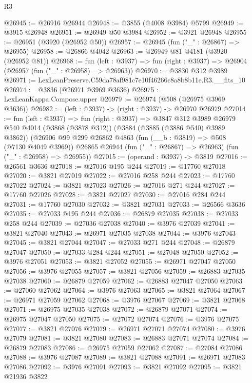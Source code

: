 \begin{lexlean}{R3}
\begin{coremodule}
@26945 := @26916 @26944
@26948 := @3855 (@4008 @3984) @5799
@26949 := @3915 @26948
@26951 := @26949 @50 @3984
@26952 := @3921 @26948
@26955 := @26951 (@3920 (@26952 @50))
@26957 := @26945 (fun ("_" : @26867) => @26955)
@26958 := @26866 @4042
@26963 := @26949 @81 @4181 (@3920 (@26952 @81))
@26968 := fun (left : @3937) =>
  fun (right : @3937) => @26904 (@26957 (fun ("_" : @26958) => @26963))
@26970 := @3830 @312 @3989
@26971 := LexLeanPreserve.C59da78af981c7e10f46266c8a8b8b11e.R3.__fits_10
@26974 := @3836 (@26971 @3969 @3636)
@26975 := LexLeanKappa.Compose.upper
@26979 := @26974 (@508 (@26975 @3969 @3636))
@26982 := (left : @3937) -> (right : @3937) -> @26970 @26979
@27014 := fun (left : @3937) =>
  fun (right : @3937) =>
  @3847
    @312
    @3989
    @26979
    @540
    @4014
    (@3868 (@3878 @312))
    (@3884 (@3885 (@3886 @540) @3989 @3862))
    (@26906
      @99
      @299
      @26862
      @4863
      (fun (__b : @3819) => @508 (@7130 @4049 @3969))
      @26865
      @26944
      (fun ("_" : @26867) => @26963)
      (fun ("_" : @26958) => @26955))
@27015 := (operand : @3937) -> @3819
@27016 := @26561 @3636
@27018 := @27016 @195 @244
@27019 := @17760 @27018
@27020 := @3821 @27019
@27022 := @27016 @258 @244
@27023 := @17760 @27022
@27024 := @3821 @27023
@27026 := @27016 @271 @244
@27027 := @17760 @27026
@27028 := @3821 @27027
@27030 := @27016 @284 @244
@27031 := @17760 @27030
@27032 := @3821 @27031
@27033 := @26566 @3636
@27035 := @27033 @195 @244
@27036 := @26879 @27035
@27038 := @27033 @258 @244
@27039 := @27036 @27038
@27040 := @3976 @27039
@27041 := @3821 @27040
@27043 := @26971 @27035 @27038
@27044 := @3976 @27043
@27045 := @3821 @27044
@27047 := @27033 @271 @244
@27048 := @26879 @27047
@27050 := @27033 @284 @244
@27051 := @27048 @27050
@27052 := @3976 @27051
@27053 := @3821 @27052
@27055 := @26971 @27047 @27050
@27056 := @3976 @27055
@27057 := @3821 @27056
@27059 := @26883 @27035 @27038
@27060 := @26879 @27059
@27062 := @26883 @27047 @27050
@27063 := @27060 @27062
@27064 := @3976 @27063
@27065 := @3821 @27064
@27067 := @26971 @27059 @27062
@27068 := @3976 @27067
@27069 := @3821 @27068
@27071 := @26975 @27035 @27038
@27072 := @26879 @27071
@27074 := @26975 @27047 @27050
@27075 := @27072 @27074
@27076 := @3976 @27075
@27077 := @3821 @27076
@27079 := @26971 @27071 @27074
@27080 := @3976 @27079
@27081 := @3821 @27080
@27083 := @26883 @27071 @27074
@27084 := @26879 @27083
@27086 := @26975 @27059 @27062
@27087 := @27084 @27086
@27088 := @3976 @27087
@27089 := @3821 @27088
@27091 := @26971 @27083 @27086
@27092 := @3976 @27091
@27093 := @3821 @27092
@27095 := @3821 @21936 @3822

\end{coremodule}
\end{lexlean}
